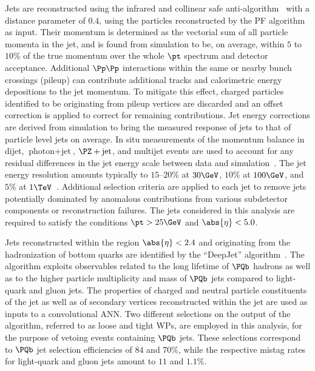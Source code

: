 Jets are reconstructed using the infrared and collinear safe anti-\kt algorithm~\cite{Cacciari:2008gp, Cacciari:2011ma} with a distance parameter of $0.4$,
using the particles reconstructed by the PF algorithm as input.
Their momentum is determined as the vectorial sum of all particle momenta in the jet, 
and is found from simulation to be, on average, within $5$ to $10\%$ of the true momentum over the whole $\pt$ spectrum and detector acceptance.
Additional $\Pp\Pp$ interactions within the same or nearby bunch crossings (pileup) can contribute additional tracks and calorimetric energy depositions to the jet momentum. 
To mitigate this effect, charged particles identified to be originating from pileup vertices are discarded and an offset correction is applied to correct for remaining contributions. 
Jet energy corrections are derived from simulation to bring the measured response of jets to that of particle level jets on average. 
In situ measurements of the momentum balance in dijet, $\text{photon} + \text{jet}$, $\PZ + \text{jet}$, and multijet events 
are used to account for any residual differences in the jet energy scale between data and simulation~\cite{Khachatryan:2016kdb}. 
The jet energy resolution amounts typically to $15$--$20\%$ at $30\GeV$, $10\%$ at $100\GeV$, and $5\%$ at $1\TeV$~\cite{Khachatryan:2016kdb}. 
Additional selection criteria are applied to each jet to remove jets potentially dominated by anomalous contributions from various subdetector components or reconstruction failures.
The jets considered in this analysis are required to satisfy the conditions $\pt > 25\GeV$ and $\abs{\eta} < 5.0$.

Jets reconstructed within the region $\abs{\eta} < 2.4$ and originating from the hadronization of bottom quarks
are identified by the ``DeepJet'' algorithm~\cite{CMS-DP-2017-013}.
The algorithm exploits observables related to the long lifetime of $\Pbottom$ hadrons 
as well as to the higher particle multiplicity and mass of $\Pbottom$ jets compared to light-quark and gluon jets.
The properties of charged and neutral particle constituents of the jet as well as of secondary vertices reconstructed within the jet
are used as inputs to a convolutional ANN.
Two different selections on the output of the algorithm, referred to as loose and tight WPs, are employed in this analysis, 
for the purpose of vetoing events containing $\Pbottom$ jets.
These selections correspond to $\Pbottom$ jet selection efficiencies of $84$ and $70\%$,
while the respective mistag rates for light-quark and gluon jets amount to $11$ and $1.1\%$.

